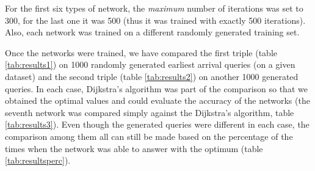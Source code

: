 	\noindent For the first six types of network, the \textit{maximum} number of iterations was set to 300, for the last one it was 500 (thus it was trained with exactly 500 iterations). Also, each network was trained on a different randomly generated training set. 
	
	Once the networks were trained, we have compared the first triple (table \ref{tab:results1}) on 1000 randomly generated earliest arrival queries (on a given dataset) and the second triple (table \ref{tab:results2}) on another 1000 generated queries. In each case, Dijkstra's algorithm was part of the comparison so that we obtained the optimal values and could evaluate the accuracy of the networks (the seventh network was compared simply against the Dijkstra's algorithm, table \ref{tab:results3}). Even though the generated queries were different in each case, the comparison among them all can still be made based on the percentage of the times when the network was able to answer with the optimum (table \ref{tab:resultsperc}).
    
